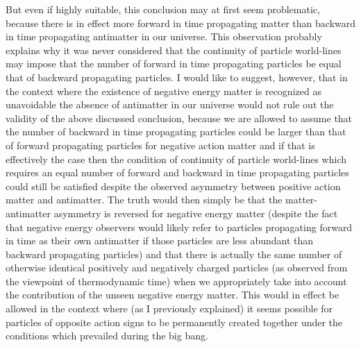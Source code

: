 \documentclass[notitlepage,12pt]{report}
\begin{document}
But even if highly suitable, this conclusion may at first seem problematic, because there is in effect more forward in time propagating matter than backward in time propagating antimatter in our universe. This observation probably explains why it was never considered that the continuity of particle world-lines may impose that the number of forward in time propagating particles be equal that of backward propagating particles. I would like to suggest, however, that in the context where the existence of negative energy matter is recognized as unavoidable the absence of antimatter in our universe would not rule out the validity of the above discussed conclusion, because we are allowed to assume that the number of backward in time propagating particles could be larger than that of forward propagating particles for negative action matter and if that is effectively the case then the condition of continuity of particle world-lines which requires an equal number of forward and backward in time propagating particles could still be satisfied despite the observed asymmetry between positive action matter and antimatter. The truth would then simply be that the matter-antimatter asymmetry is reversed for negative energy matter (despite the fact that negative energy observers would likely refer to particles propagating forward in time as their own antimatter if those particles are less abundant than backward propagating particles) and that there is actually the same number of otherwise identical positively and negatively charged particles (as observed from the viewpoint of thermodynamic time) when we appropriately take into account the contribution of the unseen negative energy matter. This would in effect be allowed in the context where (as I previously explained) it seems possible for particles of opposite action signs to be permanently created together under the conditions which prevailed during the big bang.
\end{document}
